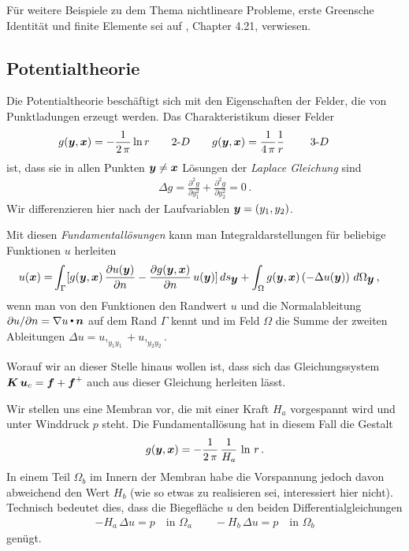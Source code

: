 F\"{u}r weitere Beispiele zu dem Thema nichtlineare Probleme, erste Greensche Identit\"{a}t und finite Elemente sei auf \cite{Ha5}, Chapter 4.21, verwiesen.

\textcolor{sectionTitleBlue}{\section{Potentialtheorie}}
Die Potentialtheorie besch\"{a}ftigt sich mit den Eigenschaften der Felder, die von Punktladungen erzeugt werden. Das Charakteristikum dieser Felder
\begin{align}
 g(\mbox{\boldmath $y$}, \mbox{\boldmath $x$}) = - \frac{1}{2\,\pi}\ln r \qquad \text{2-$D$} \qquad g(\mbox{\boldmath $y$}, \mbox{\boldmath $x$}) = \frac{1}{4\,\pi}\frac{1}{r} \qquad \text{ 3-$D$} \qquad
\end{align}
ist, dass sie in allen Punkten $\mbox{\boldmath $y$} \neq \mbox{\boldmath $x$}$  L\"{o}sungen der {\em Laplace Gleichung\/} sind
\begin{align}
\Delta g = \frac{\partial^2 g}{\partial y_{1}^2 } +\frac{\partial^2 g}{\partial y_{2}^2 } = 0\,.
\end{align}
Wir differenzieren hier nach der Laufvariablen $\mbox{\boldmath $y$} = (y_1,y_2)$.

Mit diesen {\em Fundamentall\"{o}sungen\/} kann man Integraldarstellungen f\"{u}r beliebige Funktionen $u$ herleiten
\begin{align} \label{U207}
u(\mbox{\boldmath $x$}) = &\int_{\Gamma} [g(\mbox{\boldmath $y$}, \mbox{\boldmath $x$}) \,\frac{\partial u(\mbox{\boldmath $y$})}{\partial n} - \frac{\partial g(\mbox{\boldmath $y$}, \mbox{\boldmath $x$})}{\partial n}\,u(\mbox{\boldmath $y$})]\,ds_{\mbox{\boldmath $y$}} + \int_{\Omega} g(\mbox{\boldmath $y$}, \mbox{\boldmath $x$})\,(- \Delta u(\mbox{\boldmath $y$}))\,\,d\Omega_{\mbox{\boldmath $y$}}\,,
\end{align}
wenn man von den Funktionen den Randwert $u$ und die Normalableitung $\partial u/\partial n = \nabla u {\,\scriptscriptstyle \stackrel{\bullet}{{}}}\, \mbox{\boldmath $n$}$ auf dem Rand $\Gamma$ kennt und im Feld $\Omega$ die Summe der zweiten Ableitungen $\Delta u = u,_{y_1 y_1} + u,_{y_2 y_2}$.

Worauf wir an dieser Stelle hinaus wollen ist, dass sich das Gleichungssystem $\mbox{\boldmath $K$}\,\mbox{\boldmath $u$}_c = \mbox{\boldmath $f$} + \mbox{\boldmath $f$}^+$ auch aus dieser Gleichung herleiten l\"{a}sst.

Wir stellen uns eine Membran vor, die mit einer Kraft $H_a$  vorgespannt wird und unter Winddruck $p$ steht. Die Fundamentall\"{o}sung hat in diesem Fall die Gestalt
\begin{align}
g(\mbox{\boldmath $y$}, \mbox{\boldmath $x$}) = - \frac{1}{2\,\pi} \,\frac{1}{H_a}\,\ln\,r\,.
\end{align}
In einem Teil $\Omega_b$ im Innern der Membran habe die Vorspannung jedoch davon abweichend den Wert $H_b$ (wie so etwas zu realisieren sei, interessiert hier nicht). Technisch bedeutet dies, dass die Biegefl\"{a}che $u$ den beiden Differentialgleichungen
\begin{align}
- H_a\,\Delta u = p \quad \text{in $\Omega_a$} \qquad - H_b\,\Delta u = p \quad \text{in $\Omega_b$}
\end{align}
gen\"{u}gt.

